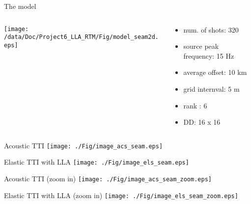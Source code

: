 \documentclass[aspectratio=169]{beamer}
\begin{document}
\begin{frame}{The model}
\begin{columns}
  \begin{column}{0.7\textwidth}
  \texttt{[image: /data/Doc/Project6\_LLA\_RTM/Fig/model\_seam2d.eps]}
  \end{column}
  \begin{column}{0.3\textwidth}
\begin{itemize}
\item{num. of shots: 320}
\item{source peak frequency: 15 Hz}
\item{average offset: 10 km}
\item{grid internval: 5 m}
\item{rank : 6}
\item{DD: 16 x 16}
\end{itemize}
  \end{column}
\end{columns}
\end{frame}
\begin{frame}{Acoustic TTI}
\center
  \texttt{[image: ./Fig/image\_acs\_seam.eps]}
\end{frame}
\begin{frame}{Elastic TTI with LLA}
\center
  \texttt{[image: ./Fig/image\_els\_seam.eps]}
\end{frame}
\begin{frame}{Acoustic TTI (zoom in)}
\center
  \texttt{[image: ./Fig/image\_acs\_seam\_zoom.eps]}
\end{frame}
\begin{frame}{Elastic TTI with LLA (zoom in)}
\center
  \texttt{[image: ./Fig/image\_els\_seam\_zoom.eps]}
\end{frame}
\end{document}
